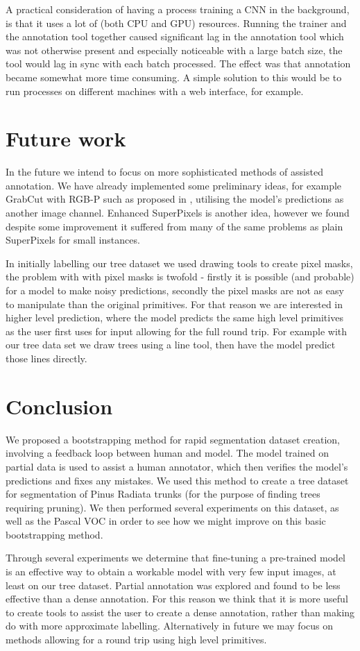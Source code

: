 A practical consideration of having a process training a \gls{CNN} in the background, is that it uses a lot of (both CPU and GPU) resources. Running the trainer and the annotation tool together caused significant lag in the annotation tool which was not otherwise present and especially noticeable with a large batch size, the tool would lag in sync with each batch processed. The effect was that annotation became somewhat more time consuming. A simple solution to this would be to run processes on different machines with a web interface, for example.


\section{Future work}


In the future we intend to focus on more sophisticated methods of assisted annotation. We have already implemented some preliminary ideas, for example GrabCut with RGB-P such as proposed in \cite{Xu2016a}, utilising the model's predictions as another image channel.  Enhanced SuperPixels is another idea, however we found despite some improvement it suffered from many of the same problems as plain SuperPixels for small instances. 

In initially labelling our tree dataset we used drawing tools to create pixel masks, the problem with with pixel masks is twofold - firstly it is possible (and probable) for a model to make noisy predictions, secondly the pixel masks are not as easy to manipulate than the original primitives. For that reason we are interested in higher level prediction, where the model predicts the same high level primitives as the user first uses for input allowing for the full round trip. For example with our tree data set we draw trees using a line tool, then have the model predict those lines directly.


\section {Conclusion}

We proposed a bootstrapping method for rapid segmentation dataset creation, involving a feedback loop between human and model. The model trained on partial data is used to assist a human annotator, which then verifies the model's predictions and fixes any mistakes. We used this method to create a tree dataset for segmentation of Pinus Radiata trunks (for the purpose of finding trees requiring pruning). We then performed several experiments on this dataset, as well as the Pascal VOC in order to see how we might improve on this basic bootstrapping method. 

Through several experiments we determine that fine-tuning a pre-trained model is an effective way to obtain a workable model with very few input images, at least on our tree dataset. Partial annotation was explored and found to be less effective than a dense annotation. For this reason we think that it is more useful to create tools to assist the user to create a dense annotation, rather than making do with more approximate labelling. Alternatively in future we may focus on methods allowing for a round trip using high level primitives.



